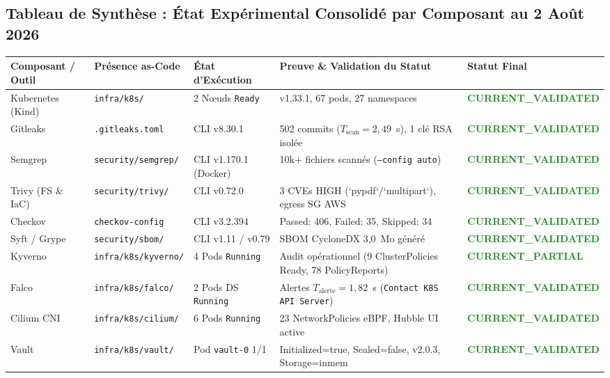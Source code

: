 \subsection{Tableau de Synthèse : État Expérimental Consolidé par Composant au 2 Août 2026}

\begin{table}[H]
\centering
\scriptsize
\begin{tabular}{@{}p{2.6cm}p{2.2cm}p{2.2cm}p{4.8cm}p{2.0cm}@{}}
\toprule
\textbf{Composant / Outil} & \textbf{Présence as-Code} & \textbf{État d'Exécution} & \textbf{Preuve \& Validation du Statut} & \textbf{Statut Final} \\
\midrule
Kubernetes (Kind) & \texttt{infra/k8s/} & 2 Nœuds \texttt{Ready} & v1.33.1, 67 pods, 27 namespaces & \textcolor{ForestGreen}{\textbf{CURRENT\_VALIDATED}} \\
Gitleaks & \texttt{.gitleaks.toml} & CLI v8.30.1 & 502 commits ($T_{\text{scan}} = 2,49$~s), 1 clé RSA isolée & \textcolor{ForestGreen}{\textbf{CURRENT\_VALIDATED}} \\
Semgrep & \texttt{security/semgrep/} & CLI v1.170.1 (Docker) & 10k+ fichiers scannés (\texttt{--config auto}) & \textcolor{ForestGreen}{\textbf{CURRENT\_VALIDATED}} \\
Trivy (FS \& IaC) & \texttt{security/trivy/} & CLI v0.72.0 & 3 CVEs HIGH (`pypdf`/`multipart`), egress SG AWS & \textcolor{ForestGreen}{\textbf{CURRENT\_VALIDATED}} \\
Checkov & \texttt{checkov-config} & CLI v3.2.394 & Passed: 406, Failed: 35, Skipped: 34 & \textcolor{ForestGreen}{\textbf{CURRENT\_VALIDATED}} \\
Syft / Grype & \texttt{security/sbom/} & CLI v1.11 / v0.79 & SBOM CycloneDX 3,0~Mo généré & \textcolor{ForestGreen}{\textbf{CURRENT\_VALIDATED}} \\
Kyverno & \texttt{infra/k8s/kyverno/} & 4 Pods \texttt{Running} & Audit opérationnel (9 ClusterPolicies Ready, 78 PolicyReports) & \textcolor{ForestGreen}{\textbf{CURRENT\_PARTIAL}} \\
Falco & \texttt{infra/k8s/falco/} & 2 Pods DS \texttt{Running} & Alertes $T_{\text{alerte}} = 1,82$~s (\texttt{Contact K8S API Server}) & \textcolor{ForestGreen}{\textbf{CURRENT\_VALIDATED}} \\
Cilium CNI & \texttt{infra/k8s/cilium/} & 6 Pods \texttt{Running} & 23 NetworkPolicies eBPF, Hubble UI active & \textcolor{ForestGreen}{\textbf{CURRENT\_VALIDATED}} \\
Vault & \texttt{infra/k8s/vault/} & Pod \texttt{vault-0} 1/1 & Initialized=true, Sealed=false, v2.0.3, Storage=inmem & \textcolor{ForestGreen}{\textbf{CURRENT\_VALIDATED}} \\

\end{tabular}
\end{table}
